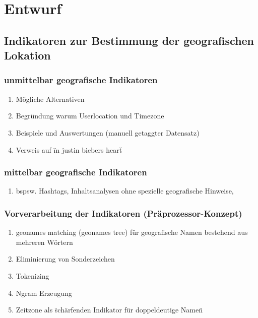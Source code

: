 \chapter{Entwurf} 

\section{Indikatoren zur Bestimmung der geografischen Lokation}

	\subsection{unmittelbar geografische Indikatoren}
		\begin{enumerate}
			\item Mögliche Alternativen
			\item Begründung warum Userlocation und Timezone
			\item Beispiele und Auswertungen (manuell getaggter Datensatz)
			\item Verweis auf \"in justin biebers heart\"
		\end{enumerate}

	\subsection{mittelbar geografische Indikatoren}
		\begin{enumerate}
			\item bspsw. Hashtags, Inhaltsanalysen ohne spezielle geografische Hinweise, 
		\end{enumerate}

	\subsection{Vorverarbeitung der Indikatoren (Präprozessor-Konzept)}
		\begin{enumerate}
			\item geonames matching (geonames tree) für geografische Namen bestehend aus mehreren Wörtern
			\item Eliminierung von Sonderzeichen
			\item Tokenizing
			\item Ngram Erzeugung
			\item {} Zeitzone als \"schärfenden Indikator für doppeldeutige Namen\"
		\end{enumerate}

